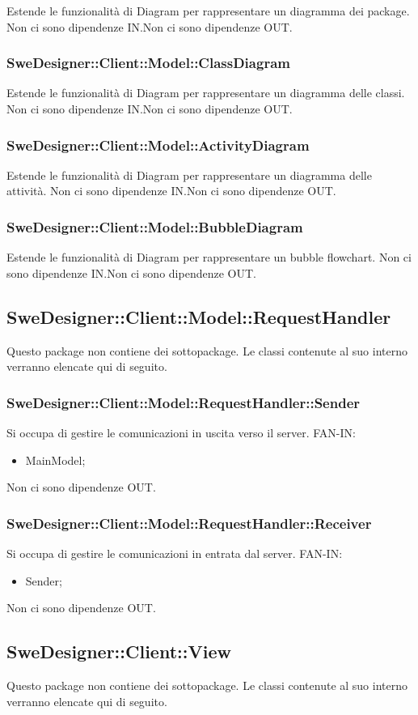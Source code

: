 \documentclass[../PianoDiQualifica.tex]{subfiles}
\begin{document}
		Estende le funzionalità di Diagram per rappresentare un diagramma dei package.
		Non ci sono dipendenze IN.Non ci sono dipendenze OUT.\subsubsection{SweDesigner::Client::Model::ClassDiagram}
		Estende le funzionalità di Diagram per rappresentare un diagramma delle classi.
		Non ci sono dipendenze IN.Non ci sono dipendenze OUT.\subsubsection{SweDesigner::Client::Model::ActivityDiagram}
		Estende le funzionalità di Diagram per rappresentare un diagramma delle attività.
		Non ci sono dipendenze IN.Non ci sono dipendenze OUT.\subsubsection{SweDesigner::Client::Model::BubbleDiagram}
		Estende le funzionalità di Diagram per rappresentare un bubble flowchart.
		Non ci sono dipendenze IN.Non ci sono dipendenze OUT.\subsection{SweDesigner::Client::Model::RequestHandler}
		Questo package non contiene dei sottopackage.
		Le classi contenute al suo interno verranno elencate qui di seguito.
		\subsubsection{SweDesigner::Client::Model::RequestHandler::Sender}
		Si occupa di gestire le comunicazioni in uscita verso il server.
		FAN-IN:
		\begin{itemize}
			\item MainModel;
		\end{itemize}
		Non ci sono dipendenze OUT.\subsubsection{SweDesigner::Client::Model::RequestHandler::Receiver}
		Si occupa di gestire le comunicazioni in entrata dal server.
		FAN-IN:
		\begin{itemize}
			\item Sender;
		\end{itemize}
		Non ci sono dipendenze OUT.\subsection{SweDesigner::Client::View}
		Questo package non contiene dei sottopackage.
		Le classi contenute al suo interno verranno elencate qui di seguito.
\end{document}
